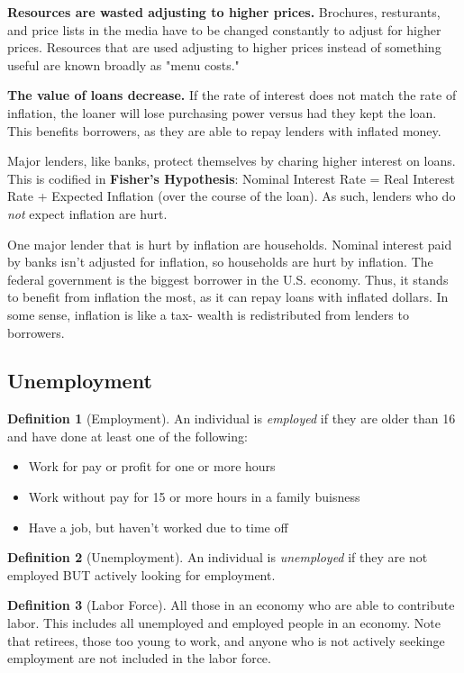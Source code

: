 \documentclass[12pt, a4paper]{article}
\theoremstyle{definition}
\newtheorem{definition}{Definition}
\begin{document}
\textbf{Resources are wasted adjusting to higher prices.}
Brochures, resturants, and price lists in the media have to be changed constantly to adjust for higher prices.
Resources that are used adjusting to higher prices instead of something useful are known broadly as "menu costs."

\textbf{The value of loans decrease.}
If the rate of interest does not match the rate of inflation, the loaner will lose purchasing power versus had they kept the loan.
This benefits borrowers, as they are able to repay lenders with inflated money.

Major lenders, like banks, protect themselves by charing higher interest on loans.
This is codified in \textbf{Fisher's Hypothesis}: Nominal Interest Rate = Real Interest Rate + Expected Inflation (over the course of the loan).
As such, lenders who do \textit{not} expect inflation are hurt.

One major lender that is hurt by inflation are households.
Nominal interest paid by banks isn't adjusted for inflation, so households are hurt by inflation.
The federal government is the biggest borrower in the U.S. economy.
Thus, it stands to benefit from inflation the most, as it can repay loans with inflated dollars.
In some sense, inflation is like a tax- wealth is redistributed from lenders to borrowers.

\subsection{Unemployment}
\begin{definition}[Employment]
    An individual is \textit{employed} if they are older than 16 and have done at least one of the following:
    \begin{itemize}
        \item Work for pay or profit for one or more hours
        \item Work without pay for 15 or more hours in a family buisness
        \item Have a job, but haven't worked due to time off
    \end{itemize}
\end{definition}

\begin{definition}[Unemployment]
    An individual is \textit{unemployed} if they are not employed BUT actively looking for employment.
\end{definition}

\begin{definition}[Labor Force]
    All those in an economy who are able to contribute labor.
    This includes all unemployed and employed people in an economy.
    Note that retirees, those too young to work, and anyone who is not actively seekinge employment are not included in the labor force.
\end{definition}
\end{document}
